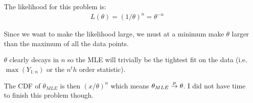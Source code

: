 
The likelihood for this problem is:
\begin{align*}
    L(\theta) = (1/\theta)^n = \theta^{-n}
\end{align*}

Since we want to make the likelihood large, we must at a minimum make $\theta$ larger than the maximum of all the data points.

$\theta$ clearly decays in $n$ so the MLE will trivially be the tightest fit on the data (i.e. $\max(Y_{1:n})$ or the $n^th$ order statistic).

The CDF of $\theta_{MLE}$ is then $(x/\theta)^n$ which means $\theta_{MLE}\overset{p}{\rightarrow} \theta$.
I did not have time to finish this problem though.




